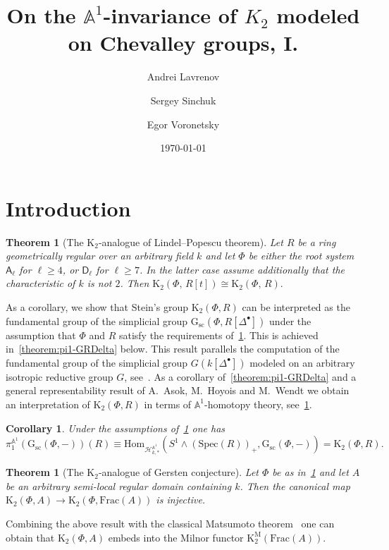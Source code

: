 \documentclass[oneside, 11pt]{amsart} \pdfoutput=1
\title{On the $\mathbb{A}^1$-invariance of $K_2$ modeled on Chevalley groups, I.}
\author[1] {Andrei Lavrenov} \email{avlavrenov at gmail.com}
\author[2] {Sergey Sinchuk} \email{sinchukss at gmail.com}
\author[3] {Egor Voronetsky} \email{voronetckiiegor at yandex.ru}
\date {\today}
\newcommand{\K}{{\mathrm{K}}}
\newcommand{\Gsc}{\mathrm{G}_\mathrm{sc}}
\numberwithin{equation}{section}
\newtheorem{theorem}[lemma]{Theorem}
\newtheorem{corollary}[lemma]{Corollary}
\theoremstyle{definition}
\newcommand{\rA}{\mathsf{A}}
\newcommand{\rD}{\mathsf{D}}
\begin{document}
\maketitle
\section{Introduction}

\begin{theorem}[The $\K_2$-analogue of Lindel--Popescu theorem] \label{theorem:LP-for-K2}
Let $R$ be a ring geometrically regular over an arbitrary field $k$ and let $\Phi$ be either the root system $\rA_\ell$ for $\ell\geq4$, or $\rD_\ell$ for $\ell\geq 7$. In the latter case assume additionally that the characteristic of $k$ is not $2$. Then $\K_2(\Phi,\,R[t])\cong\K_2(\Phi,\,R).$
\end{theorem}

As a corollary, we show that Stein's group $\K_2(\Phi, R)$ can be interpreted as the fundamental group of the simplicial group $\Gsc(\Phi, R[\Delta^\bullet])$ under the assumption that $\Phi$ and $R$ satisfy the requirements of~\cref{theorem:LP-for-K2}. This is achieved in~\cref{theorem:pi1-GRDelta} below. This result parallels the computation of the fundamental group of the simplicial group $G(k[\Delta^\bullet])$ modeled on an arbitrary isotropic reductive group $G$, see~\cite[Proposition~3.2]{VW16}. As a corollary of~\cref{theorem:pi1-GRDelta} and a general representability result of A.~Asok, M.~Hoyois and M.~Wendt we obtain an interpretation of $\K_2(\Phi, R)$ in terms of $\mathbb{A}^1$-homotopy theory, see~\cref{cor:motivic-pi1}.

\begin{corollary} \label{cor:motivic-pi1} Under the assumptions of~\cref{theorem:LP-for-K2} one has \[\pi_1^{\mathbb{A}^1}(\Gsc(\Phi, -))(R) \equiv \mathrm{Hom}_{\mathcal{H}^{\mathbb{A}^1}_{k,*}}(S^1 \wedge (\mathrm{Spec}(R))_+, \Gsc(\Phi, -)) = \K_2(\Phi, R).\]
\end{corollary}

\begin{theorem}[The $\K_2$-analogue of Gersten conjecture] \label{theorem:Gersten} Let $\Phi$ be as in~\cref{theorem:LP-for-K2} and let $A$ be an arbitrary semi-local regular domain containing $k$. Then the canonical map $\K_2(\Phi, A) \to \K_2(\Phi, \mathrm{Frac}(A))$ is injective. \end{theorem}

Combining the above result with the classical Matsumoto theorem~\cite[Theorem~5.10]{Ma69} one can obtain that $\K_2(\Phi, A)$ embeds into the Milnor functor $\K_2^\mathrm{M}(\mathrm{Frac}(A))$.
\end{document}
